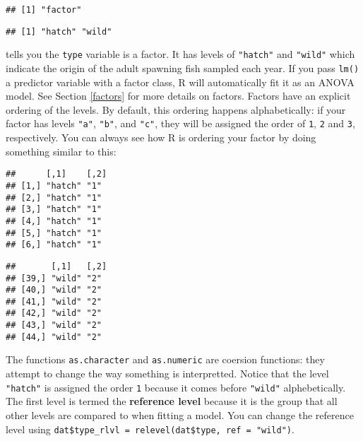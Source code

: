 \documentclass[]{book}
\newenvironment{Shaded}{\begin{snugshade}}{\end{snugshade}}
\newcommand{\KeywordTok}[1]{\textcolor[rgb]{0.13,0.29,0.53}{\textbf{#1}}}
\newcommand{\StringTok}[1]{\textcolor[rgb]{0.31,0.60,0.02}{#1}}
\newcommand{\OperatorTok}[1]{\textcolor[rgb]{0.81,0.36,0.00}{\textbf{#1}}}
\newcommand{\NormalTok}[1]{#1}
\theoremstyle{definition}
\theoremstyle{definition}
\theoremstyle{definition}
\theoremstyle{remark}
\begin{document}
\begin{verbatim}
## [1] "factor"
\end{verbatim}

\begin{verbatim}
## [1] "hatch" "wild"
\end{verbatim}

tells you the \texttt{type} variable is a factor. It has levels of
\texttt{"hatch"} and \texttt{"wild"} which indicate the origin of the
adult spawning fish sampled each year. If you pass \texttt{lm()} a
predictor variable with a factor class, R will automatically fit it as
an ANOVA model. See Section \ref{factors} for more details on factors.
Factors have an explicit ordering of the levels. By default, this
ordering happens alphabetically: if your factor has levels \texttt{"a"},
\texttt{"b"}, and \texttt{"c"}, they will be assigned the order of
\texttt{1}, \texttt{2} and \texttt{3}, respectively. You can always see
how R is ordering your factor by doing something similar to this:

\begin{Shaded}
\end{Shaded}

\begin{verbatim}
##      [,1]    [,2]
## [1,] "hatch" "1" 
## [2,] "hatch" "1" 
## [3,] "hatch" "1" 
## [4,] "hatch" "1" 
## [5,] "hatch" "1" 
## [6,] "hatch" "1"
\end{verbatim}

\begin{verbatim}
##       [,1]   [,2]
## [39,] "wild" "2" 
## [40,] "wild" "2" 
## [41,] "wild" "2" 
## [42,] "wild" "2" 
## [43,] "wild" "2" 
## [44,] "wild" "2"
\end{verbatim}

The functions \texttt{as.character} and \texttt{as.numeric} are coersion
functions: they attempt to change the way something is interpretted.
Notice that the level \texttt{"hatch"} is assigned the order \texttt{1}
because it comes before \texttt{"wild"} alphebetically. The first level
is termed the \textbf{reference level} because it is the group that all
other levels are compared to when fitting a model. You can change the
reference level using
\texttt{dat\$type\_rlvl\ =\ relevel(dat\$type,\ ref\ =\ "wild")}.
\end{document}
